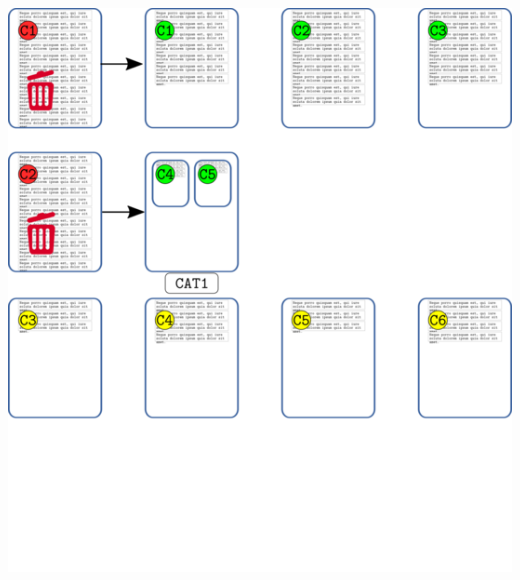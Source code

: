 \hypertarget{section-3}{%
\subsection{}\label{section-3}}

\includegraphics{imagenes-atlas-8/Categorizacion03.png}

\hypertarget{section-4}{%
\subsection{}\label{section-4}}

